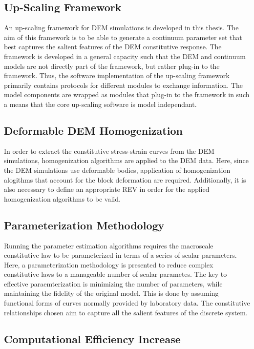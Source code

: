 \subsection*{Up-Scaling Framework}

An up-scaling framework for DEM simulations is developed in this thesis. The aim of this framework is to be able to generate a continuum parameter set that best captures the salient features of the DEM constitutive response. The framework is developed in a general capacity such that the DEM and continuum models are not directly part of the framework, but rather plug-in to the framework. Thus, the software implementation of the up-scaling framework primarily contains protocols for different modules to exchange information. The model components are wrapped as modules that plug-in to the framework in such a means that the core up-scaling software is model independant. 

\subsection*{Deformable DEM Homogenization}

In order to extract the constitutive stress-strain curves from the DEM simulations, homogenization algorithms are applied to the DEM data. Here, since the DEM simulations use deformable bodies, application of homogenization alogithms that account for the block deformation are required.  Additionally, it is also necessary to define an appropriate REV in order for the applied homogenization algorithms to be valid.

\subsection*{Parameterization Methodology}

Running the parameter estimation algorithms requires the macroscale constitutive law to be parameterized in terms of a series of scalar parameters. Here, a parameterization methodology is presented to reduce complex constitutive laws to a manageable number of scalar parametes. The key to effective paraemterization is minimizing the number of parameters, while maintaining the fidelity of the original model. This is done by assuming functional forms of curves normally provided by laboratory data. The constitutive relationships chosen aim to capture all the salient features of the discrete system. 

\subsection*{Computational Efficiency Increase}

